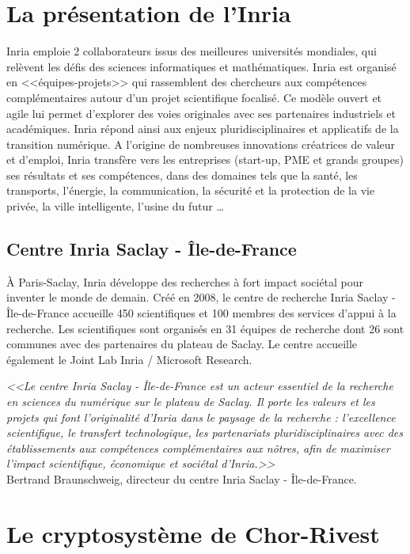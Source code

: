 \documentclass[a4paper, titlepage, 11pt]{article}
\theoremstyle{definition}
\theoremstyle{remark}
\begin{document}
\section{La présentation de l'Inria}\label{sec:presInria}

Inria emploie 2 collaborateurs issus des meilleures universités mondiales, qui relèvent les défis des sciences informatiques et mathématiques. Inria est organisé en <<équipes-projets>> qui rassemblent des chercheurs aux compétences complémentaires autour d’un projet scientifique focalisé. Ce modèle ouvert et agile lui permet d’explorer des voies originales avec ses partenaires industriels et académiques. Inria répond ainsi aux enjeux pluridisciplinaires et applicatifs de la transition numérique. A l'origine de nombreuses innovations créatrices de valeur et d'emploi, Inria transfère vers les entreprises (start-up, PME et grands groupes) ses résultats et ses compétences, dans des domaines tels que la santé, les transports, l'énergie, la communication, la sécurité et la protection de la vie privée, la ville intelligente, l’usine du futur …

\subsection{Centre Inria Saclay - Île-de-France}

À Paris-Saclay, Inria développe des recherches à fort impact sociétal pour inventer le monde de demain. Créé en 2008, le centre de recherche Inria Saclay - Île-de-France accueille 450 scientifiques et 100 membres des services d’appui à la recherche. Les scientifiques sont organisés en 31 équipes de recherche dont 26 sont communes avec des partenaires du plateau de Saclay. Le centre accueille également le Joint Lab Inria / Microsoft Research.

\textit{<<Le centre Inria Saclay - Île-de-France est un acteur essentiel de la recherche en sciences du numérique sur le plateau de Saclay. Il porte les valeurs et les projets qui font l’originalité d’Inria dans le paysage de la recherche : l’excellence scientifique, le transfert technologique, les partenariats pluridisciplinaires avec des établissements aux compétences complémentaires aux nôtres, afin de maximiser l’impact scientifique, économique et sociétal d’Inria.>>} \\
Bertrand Braunschweig, directeur du centre Inria Saclay - Île-de-France.  

\section{Le cryptosystème de Chor-Rivest}\label{sec:cryptosysteme}
\end{document}
